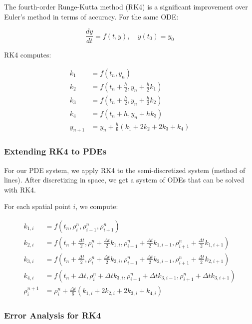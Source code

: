 \documentclass[a4paper,12pt]{article}
\begin{document}
The fourth-order Runge-Kutta method (RK4) is a significant improvement over Euler's method in terms of accuracy. For the same ODE:

\begin{equation}
\frac{dy}{dt} = f(t, y), \quad y(t_0) = y_0
\end{equation}

RK4 computes:

\begin{align}
k_1 &= f(t_n, y_n) \\
k_2 &= f(t_n + \frac{h}{2}, y_n + \frac{h}{2}k_1) \\
k_3 &= f(t_n + \frac{h}{2}, y_n + \frac{h}{2}k_2) \\
k_4 &= f(t_n + h, y_n + hk_3) \\
y_{n+1} &= y_n + \frac{h}{6}(k_1 + 2k_2 + 2k_3 + k_4)
\end{align}

\subsubsection{Extending RK4 to PDEs}

For our PDE system, we apply RK4 to the semi-discretized system (method of lines). After discretizing in space, we get a system of ODEs that can be solved with RK4.

For each spatial point $i$, we compute:

\begin{align}
k_{1,i} &= f(t_n, \rho_i^n, \rho_{i-1}^n, \rho_{i+1}^n) \\
k_{2,i} &= f(t_n + \frac{\Delta t}{2}, \rho_i^n + \frac{\Delta t}{2}k_{1,i}, \rho_{i-1}^n + \frac{\Delta t}{2}k_{1,i-1}, \rho_{i+1}^n + \frac{\Delta t}{2}k_{1,i+1}) \\
k_{3,i} &= f(t_n + \frac{\Delta t}{2}, \rho_i^n + \frac{\Delta t}{2}k_{2,i}, \rho_{i-1}^n + \frac{\Delta t}{2}k_{2,i-1}, \rho_{i+1}^n + \frac{\Delta t}{2}k_{2,i+1}) \\
k_{4,i} &= f(t_n + \Delta t, \rho_i^n + \Delta t k_{3,i}, \rho_{i-1}^n + \Delta t k_{3,i-1}, \rho_{i+1}^n + \Delta t k_{3,i+1}) \\
\rho_i^{n+1} &= \rho_i^n + \frac{\Delta t}{6}(k_{1,i} + 2k_{2,i} + 2k_{3,i} + k_{4,i})
\end{align}

\subsubsection{Error Analysis for RK4}
\end{document}

